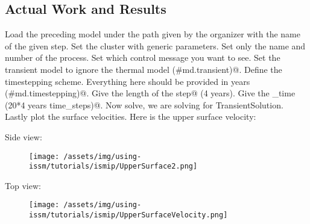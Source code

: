 \subsection{Actual Work and Results} %
Load the preceding model under the path given by the organizer with the name of the given step. Set the cluster with generic parameters. Set only the name and number of the process. Set which control message you want to see. Set the transient model to ignore the thermal model \verb@(#md.transient)@. Define the timestepping scheme. Everything here should be provided in years \verb@(#md.timestepping)@. Give the length of the \verb@time step@ (4 years). Give the \verb@final_time (20*4 years time_steps)@. Now solve, we are solving for TransientSolution. Lastly plot the surface velocities. Here is the upper surface velocity:

Side view:
\begin{figure}[H]
	\begin{center}
		\texttt{[image: /assets/img/using-issm/tutorials/ismip/UpperSurface2.png]}
	\end{center}
\end{figure}
Top view:
\begin{figure}[H]
	\begin{center}
		\texttt{[image: /assets/img/using-issm/tutorials/ismip/UpperSurfaceVelocity.png]}
	\end{center}
\end{figure}
